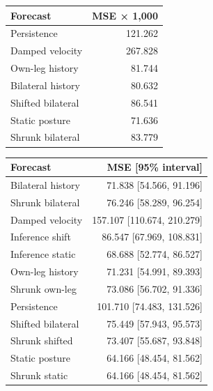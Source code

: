 \documentclass[letterpaper]{article}
\begin{document}
\begin{center}\begin{minipage}{\columnwidth}
\centering
\small
\begin{tabular}{lr}
\toprule
Forecast & MSE × 1,000 \\
\midrule
Persistence & 121.262 \\
Damped velocity & 267.828 \\
Own-leg history & 81.744 \\
Bilateral history & 80.632 \\
Shifted bilateral & 86.541 \\
Static posture & 71.636 \\
Shrunk bilateral & 83.779 \\
\bottomrule
\end{tabular}
\end{minipage}\end{center}

\begin{center}\begin{minipage}{\columnwidth}
\centering
\small
\begin{tabular}{lr}
\toprule
Forecast & MSE [95\% interval] \\
\midrule
Bilateral history & 71.838 [54.566, 91.196] \\
Shrunk bilateral & 76.246 [58.289, 96.254] \\
Damped velocity & 157.107 [110.674, 210.279] \\
Inference shift & 86.547 [67.969, 108.831] \\
Inference static & 68.688 [52.774, 86.527] \\
Own-leg history & 71.231 [54.991, 89.393] \\
Shrunk own-leg & 73.086 [56.702, 91.336] \\
Persistence & 101.710 [74.483, 131.526] \\
Shifted bilateral & 75.449 [57.943, 95.573] \\
Shrunk shifted & 73.407 [55.687, 93.848] \\
Static posture & 64.166 [48.454, 81.562] \\
Shrunk static & 64.166 [48.454, 81.562] \\
\bottomrule
\end{tabular}
\end{minipage}\end{center}
\end{document}
